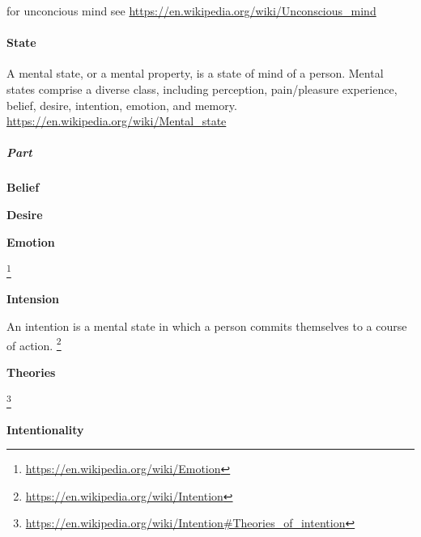 \documentclass{book}
\providecommand{\ProjectDeepHeading}[2]{%
    \par\medskip\noindent\textbf{#2}\par\smallskip
}
\providecommand{\seeherefooter}[1]{\footnote{\url{#1}}}
\begin{document}
    for unconcious mind see
    \url{https://en.wikipedia.org/wiki/Unconscious_mind}

\paragraph{State}


A mental state, or a mental property, is a state of mind of a person. Mental states comprise a diverse class, including perception, pain/pleasure experience, belief, desire, intention, emotion, and memory.
    \url{https://en.wikipedia.org/wiki/Mental_state}
    
    

\subparagraph{Part}

\ProjectDeepHeading{1}{Belief}


%

\ProjectDeepHeading{1}{Desire}


%

\ProjectDeepHeading{1}{Emotion}


\seeherefooter{https://en.wikipedia.org/wiki/Emotion}

\ProjectDeepHeading{1}{Intension}


An intention is a mental state in which a person commits themselves to a course of action. \seeherefooter{https://en.wikipedia.org/wiki/Intention}
    
    \ProjectDeepHeading{4}{Theories}


\seeherefooter{https://en.wikipedia.org/wiki/Intention\#Theories_of_intention}

\ProjectDeepHeading{2}{Intentionality}

\end{document}
